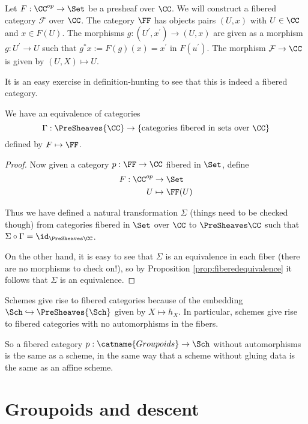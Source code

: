 \documentclass[11pt, english]{article}
\begin{document}
Let $F:\CC^{op} \to \Set$ be a presheaf over $\CC$. We will construct a fibered category $\mathcal F$ over $\CC$. The category $\FF$ has objects pairs $(U,x)$ with $U \in \CC$ and $x \in F(U)$. The morphisms  $g:(U^\prime, x^\prime) \to (U,x)$ are given as a morphism $g:U^\prime \to U$ such that $g^\ast x := F(g)(x)=x^\prime$ in $F(u^\prime)$. The morphism $\mathcal F \to \CC$ is given by $(U,X) \mapsto U$. 

It is an easy exercise in definition-hunting to see that this is indeed a fibered category. 

\begin{prop}
We have an equivalence of categories
\[
\Gamma:\PreSheaves{\CC} \to \{ \text{categories fibered in sets over } \CC \}
\]
defined by $F \mapsto \FF$. 
\end{prop}
\begin{proof}
Now given a category $p:\FF \to \CC$ fibered in $\Set$, define
\begin{align*}
F:\CC^{op} &\to \Set \\
U &\mapsto \FF(U)
\end{align*}

Thus we have defined a natural transformation $\Sigma$ (things need to be checked though) from categories fibered in $\Set$ over $\CC$ to $\PreSheaves \CC$ such that $\Sigma \circ \Gamma = \id_{\PreSheaves \CC}$. 

On the other hand, it is easy to see that $\Sigma$ is an equivalence in each fiber (there are no morphisms to check on!), so by Proposition \ref{prop:fiberedequivalence} it follows that $\Sigma$ is an equivalence.


\end{proof}

\begin{remark} Schemes give rise to fibered categories because of the embedding $\Sch \hookrightarrow \PreSheaves{\Sch}$ given by $X \mapsto h_X$. In particular, schemes give rise to fibered categories with no automorphisms in the fibers.
\end{remark}

So a fibered category $p:\catname{Groupoids} \to \Sch$ without automorphisms is the same as a scheme, in the same way that a scheme without gluing data is the same as an affine scheme.


\pagebreak
\section{Groupoids and descent}
\end{document}
